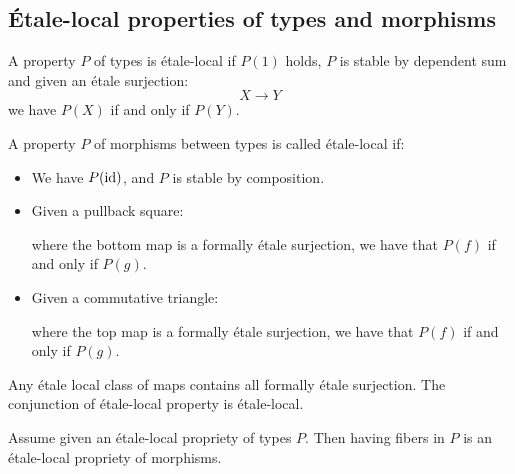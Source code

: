 \subsection{Étale-local properties of types and morphisms}

\begin{definition}
A property $P$ of types is étale-local if $P(1)$ holds, $P$ is stable by dependent sum and given an étale surjection:
\[X \to Y\]
we have $P(X)$ if and only if $P(Y)$.
\end{definition}

\begin{definition}
A property $P$ of morphisms between types is called étale-local if:
\begin{itemize}
\item We have $P(\mathrm{id})$, and $P$ is stable by composition.
\item Given a pullback square:
  \begin{center}
  \end{center}
 where the bottom map is a formally étale surjection, we have that $P(f)$ if and only if $P(g)$.
\item Given a commutative triangle:
  \begin{center}
  \end{center}
  where the top map is a formally étale surjection, we have that $P(f)$ if and only if $P(g)$.
\end{itemize}
\end{definition}

Any étale local class of maps contains all formally étale surjection. The conjunction of étale-local property is étale-local.

\begin{lemma}\label{etale-local-morphisms-from-types}
Assume given an étale-local propriety of types $P$. Then having fibers in $P$ is an étale-local propriety of morphisms. 
\end{lemma}


